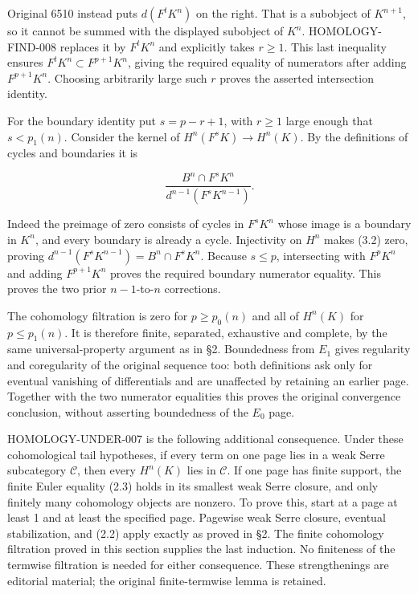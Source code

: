 \documentclass[11pt]{article}
\begin{document}
Original 6510 instead puts \(d(F^tK^n)\) on the right. That is a subobject of \(K^{n+1}\), so it cannot be summed with the displayed subobject of \(K^n\). HOMOLOGY-FIND-008 replaces it by \(F^tK^n\) and explicitly takes \(r\geq1\). This last inequality ensures \(F^tK^n\subset F^{p+1}K^n\), giving the required equality of numerators after adding \(F^{p+1}K^n\). Choosing arbitrarily large such \(r\) proves the asserted intersection identity.

For the boundary identity put \(s=p-r+1\), with \(r\geq1\) large enough that \(s<p_1(n)\). Consider the kernel of \(H^n(F^sK)\to H^n(K)\). By the definitions of cycles and boundaries it is

\[
\frac{B^n\cap F^sK^n}{d^{n-1}(F^sK^{n-1})}.       \tag{3.2}
\]

Indeed the preimage of zero consists of cycles in \(F^sK^n\) whose image is a boundary in \(K^n\), and every boundary is already a cycle. Injectivity on \(H^n\) makes (3.2) zero, proving \(d^{n-1}(F^sK^{n-1})=B^n\cap F^sK^n\). Because \(s\leq p\), intersecting with \(F^pK^n\) and adding \(F^{p+1}K^n\) proves the required boundary numerator equality. This proves the two prior \(n-1\)-to-\(n\) corrections.

The cohomology filtration is zero for \(p\geq p_0(n)\) and all of \(H^n(K)\) for \(p\leq p_1(n)\). It is therefore finite, separated, exhaustive and complete, by the same universal-property argument as in §2. Boundedness from \(E_1\) gives regularity and coregularity of the original sequence too: both definitions ask only for eventual vanishing of differentials and are unaffected by retaining an earlier page. Together with the two numerator equalities this proves the original convergence conclusion, without asserting boundedness of the \(E_0\) page.

HOMOLOGY-UNDER-007 is the following additional consequence. Under these cohomological tail hypotheses, if every term on one page lies in a weak Serre subcategory \(\mathcal C\), then every \(H^n(K)\) lies in \(\mathcal C\). If one page has finite support, the finite Euler equality (2.3) holds in its smallest weak Serre closure, and only finitely many cohomology objects are nonzero. To prove this, start at a page at least 1 and at least the specified page. Pagewise weak Serre closure, eventual stabilization, and (2.2) apply exactly as proved in §2. The finite cohomology filtration proved in this section supplies the last induction. No finiteness of the termwise filtration is needed for either consequence. These strengthenings are editorial material; the original finite-termwise lemma is retained.
\end{document}
